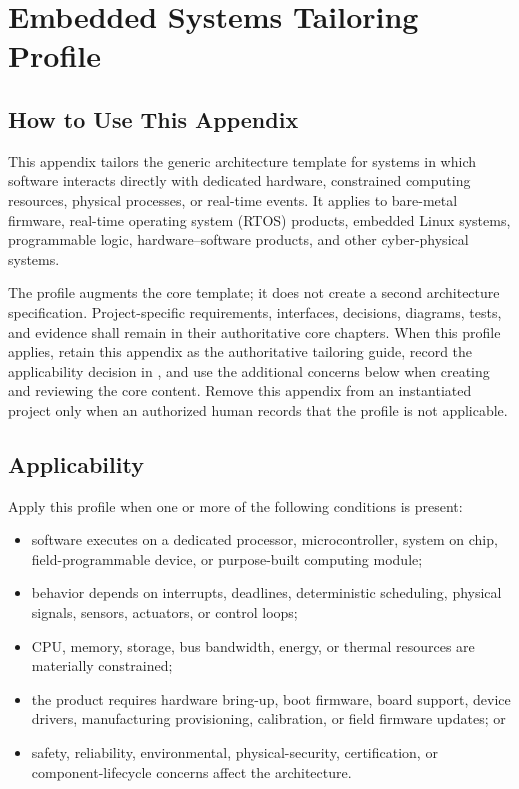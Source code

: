 \chapter{Embedded Systems Tailoring Profile}

\section{How to Use This Appendix}
This appendix tailors the generic architecture template for systems in which
software interacts directly with dedicated hardware, constrained computing
resources, physical processes, or real-time events. It applies to bare-metal
firmware, real-time operating system (RTOS) products, embedded Linux systems, programmable
logic, hardware--software products, and other cyber-physical systems.

The profile augments the core template; it does not create a second
architecture specification. Project-specific requirements, interfaces,
decisions, diagrams, tests, and evidence shall remain in their authoritative
core chapters. When this profile applies, retain this appendix as the
authoritative tailoring guide, record the applicability decision in
, and use the additional concerns below when
creating and reviewing the core content. Remove this appendix from an
instantiated project only when an authorized human records that the profile is
not applicable.

\section{Applicability}
\label{Section:EmbeddedProfileApplicability}
Apply this profile when one or more of the following conditions is present:

\begin{itemize}
\item software executes on a dedicated processor, microcontroller, system on
chip, field-programmable device, or purpose-built computing module;
\item behavior depends on interrupts, deadlines, deterministic scheduling,
physical signals, sensors, actuators, or control loops;
\item CPU, memory, storage, bus bandwidth, energy, or thermal resources are
materially constrained;
\item the product requires hardware bring-up, boot firmware, board support,
device drivers, manufacturing provisioning, calibration, or field firmware
updates; or
\item safety, reliability, environmental, physical-security, certification,
or component-lifecycle concerns affect the architecture.
\end{itemize}

